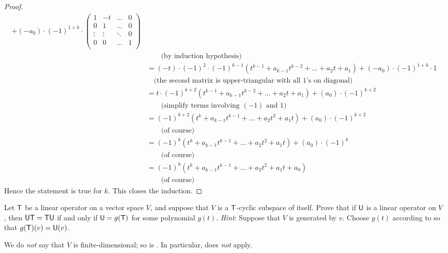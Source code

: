 \begin{proof}
\begin{align*}
      + (-a_0) \cdot (-1)^{1 + k} \cdot \begin{pmatrix}
            1      & -t     & \dots  & 0 \\
            0      & 1      & \dots  & 0 \\
            \vdots & \vdots & \ddots & 0 \\
            0      & 0      & \dots  & 1 \\
        \end{pmatrix} \\
    & \quad \quad \text{(by induction hypothesis)} \\
    & = (-t) \cdot (-1)^{2} \cdot (-1)^{k - 1} (t^{k - 1} + a_{k - 1} t^{k-2} + ... + a_2 t + a_1) + (-a_0) \cdot (-1)^{1 + k} \cdot 1 \\
    & \quad \text{(the second matrix is upper-triangular with all \(1\)'s on diagonal)} \\
    & = t \cdot (-1)^{k + 2} (t^{k - 1} + a_{k - 1} t^{k-2} + ... + a_2 t + a_1) + (a_0) \cdot (-1)^{k + 2} \\
    & \quad \quad \text{(simplify terms involving \((-1)\) and \(1\))} \\
    & = (-1)^{k + 2} (t^k + a_{k - 1} t^{k-1} + ... + a_2 t^2 + a_1 t) + (a_0) \cdot (-1)^{k + 2} \\
    & \quad \quad \text{(of course)} \\
    & = (-1)^k (t^k + a_{k - 1} t^{k-1} + ... + a_2 t^2 + a_1 t) + (a_0) \cdot (-1)^k \\
    & \quad \quad \text{(of course)} \\
    & = (-1)^k (t^k + a_{k - 1} t^{k-1} + ... + a_2 t^2 + a_1 t + a_0) \\
    & \quad \quad \text{(of course)}
\end{align*}
Hence the statement is true for \(k\).
This closes the induction.
\end{proof}

\begin{exercise} \label{exercise 5.4.20}
Let \(\textsf{T}\) be a linear operator on a vector space \(V\), and suppose that \(V\) is a \(\textsf{T}\)-cyclic subspace of itself.
Prove that if \(\textsf{U}\) is a linear operator on \(V\), then \(\textsf{U}\textsf{T} = \textsf{T}\textsf{U}\) if and only if \(\textsf{U} = g(\textsf{T})\) for some polynomial \(g(t)\).
\emph{Hint}: Suppose that \(V\) is generated by \(v\).
Choose \(g(t)\) according to  so that \(g(\textsf{T})(v) = \textsf{U}(v)\).
\end{exercise}

\begin{note}
We do \emph{not} say that \(V\) is finite-dimensional; so is .
In particular,  does \emph{not} apply.
\end{note}

